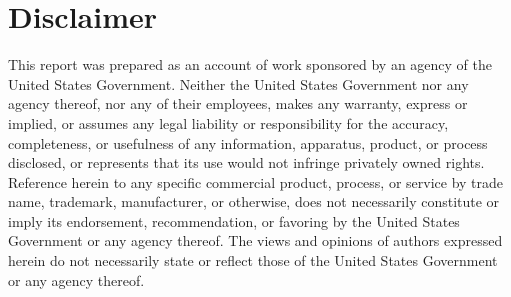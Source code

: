 \section*{Disclaimer}

This report was prepared as an account of work sponsored by an agency of the United States Government.
Neither the United States Government nor any agency thereof, nor any of their employees, makes any warranty, express or implied, or assumes any legal liability or responsibility for the accuracy, completeness, or usefulness of any information, apparatus, product, or process disclosed, or represents that its use would not infringe privately owned rights. 
Reference herein to any specific commercial product, process, or service by trade name, trademark, manufacturer, or otherwise, does not necessarily constitute or imply its endorsement, recommendation, or favoring by the United States Government or any agency thereof.
The views and opinions of authors expressed herein do not necessarily state or reflect those of the United States Government or any agency thereof.